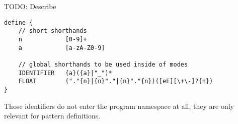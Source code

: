 TODO: Describe

\begin{lstlisting}
define {
    // short shorthands
    n            [0-9]+
    a	         [a-zA-Z0-9]
    
    // global shorthands to be used inside of modes
    IDENTIFIER   {a}({a}|"_")*
    FLOAT        ("."{n}|{n}"."|{n}"."{n})([eE][\+\-]?{n})
}    

\end{lstlisting}

Those identifiers do not enter the program namespace at all, they
are only relevant for pattern definitions.
